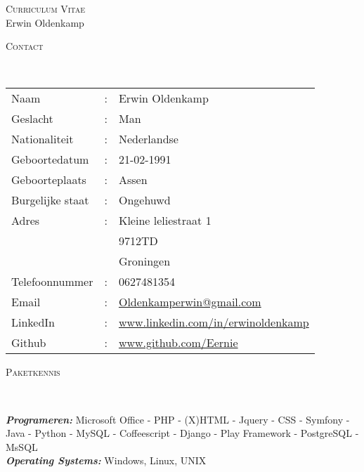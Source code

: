 \documentclass[9pt]{article}
\newenvironment{changemargin}[2]{%
  \begin{list}{}{%
    \setlength{\topsep}{0pt}%
    \setlength{\leftmargin}{#1}%
    \setlength{\rightmargin}{#2}%
    \setlength{\listparindent}{\parindent}%
    \setlength{\itemindent}{\parindent}%
    \setlength{\parsep}{\parskip}%
  }%
  \item[]}{\end{list}
}
\newcommand{\lineover}{
	\begin{changemargin}{-0.05in}{-0.05in}
		\vspace*{-8pt}
		\hrulefill \\
		\vspace*{-2pt}
	\end{changemargin}
}
\newcommand{\header}[1]{
	\begin{changemargin}{-0.5in}{-0.5in}
		\scshape{#1}\\
  	\lineover
	\end{changemargin}
}
\newcommand{\PageHead}[2]{
	\begin{changemargin}{-0.5in}{-0.5in}
		\begin{center}
			{\Large \scshape {#1}}\\ \smallskip
			{\Large {#2}}
		\end{center}
	\end{changemargin}
}
\newenvironment{body} {
	\vspace*{-16pt}
	\begin{changemargin}{-0.25in}{-0.5in}
  }	
	{\end{changemargin}
}
\begin{document}
\PageHead{Curriculum Vitae}{Erwin Oldenkamp}


\header{Contact}

\begin{body}
	\vspace{14pt}
	\begin{tabular}{l l l}
		Naam&:&Erwin Oldenkamp \\
		Geslacht&:&Man  \\
		Nationaliteit&:&Nederlandse \\
		Geboortedatum&:&21-02-1991 \\
		Geboorteplaats&:&Assen \\
		Burgelijke staat&:&Ongehuwd \\
		Adres&:&Kleine leliestraat 1 \\ 
		& & 9712TD \\ 
   		& & Groningen \\ 
		Telefoonnummer & : & 0627481354 \\
		Email &:&  \href{mailto:oldenkamperwin@gmail.com}{Oldenkamperwin@gmail.com}\\
		LinkedIn & : & \href{http://www.linkedin.com/in/erwinoldenkamp}{www.linkedin.com/in/erwinoldenkamp} \\
		Github & : & \href{http://www.github.com/Eernie}{www.github.com/Eernie} \\
	\end{tabular}
\end{body}

\smallskip

\header{Paketkennis}

\begin{body}
	\vspace{14pt}
	\emph{\textbf{Programeren:}}{} Microsoft Office - PHP - (X)HTML - Jquery - CSS - Symfony - Java - Python - MySQL - Coffeescript - Django - Play Framework - PostgreSQL - MsSQL \\
	\medskip
	\emph{\textbf{Operating Systems:}}{} Windows, Linux, UNIX\\
\end{body}
\end{document}
